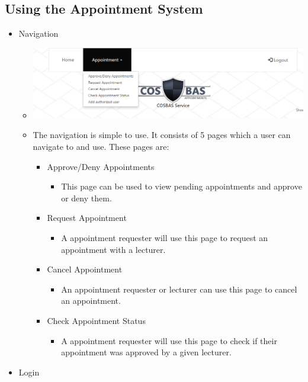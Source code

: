 \subsection{Using the Appointment System}
	\begin{itemize}
		\item Navigation
			\begin{itemize}
				\item \includegraphics[width=\linewidth]{images/Screenshots/Navigation.png}
				\item The navigation is simple to use. It consists of 5 pages which a user can navigate to and use. These pages are:
				\begin{itemize}
					\item Approve/Deny Appointments
						\begin{itemize}
							\item This page can be used to view pending appointments and approve or deny them.
						\end{itemize}
					\item Request Appointment
						\begin{itemize}
							\item A appointment requester will use this page to request an appointment with a lecturer.
						\end{itemize}
					\item Cancel Appointment
						\begin{itemize}
							\item An appointment requester or lecturer can use this page to cancel an appointment.
						\end{itemize}
					\item Check Appointment Status
						\begin{itemize}
							\item A appointment requester will use this page to check if their appointment was approved by a given lecturer.
						\end{itemize}
				\end{itemize}
			\end{itemize}
		\item Login

\end{itemize}
